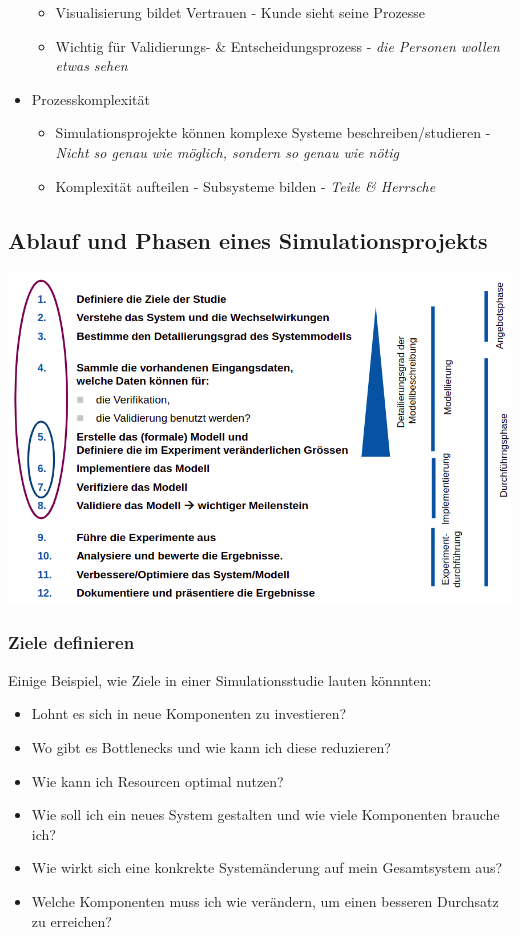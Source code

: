 \begin{itemize}
\begin{itemize}
        \item Visualisierung bildet Vertrauen - Kunde sieht seine Prozesse
        \item Wichtig für Validierungs- \& Entscheidungsprozess - \glqq \textit{ die Personen wollen etwas sehen} \grqq
    \end{itemize}
    \item Prozesskomplexität
    \begin{itemize} 
        \item Simulationsprojekte können komplexe Systeme beschreiben/studieren - \glqq \textit{ Nicht so genau wie möglich, sondern so genau wie nötig}\grqq
        \item Komplexität aufteilen - Subsysteme bilden - \glqq \textit{Teile \& Herrsche}\grqq
    \end{itemize}
\end{itemize}

\subsection{Ablauf und Phasen eines Simulationsprojekts}
\begin{minipage}[t]{1\textwidth}
    \centering
	\includegraphics[width=0.9\linewidth]{images/ablauf-simulationsprojekt.png}
\end{minipage}

\subsubsection{Ziele definieren}
Einige Beispiel, wie Ziele in einer Simulationsstudie lauten könnnten:
\begin{itemize}
    \item Lohnt es sich in neue Komponenten zu investieren?
    \item Wo gibt es Bottlenecks und wie kann ich diese reduzieren?
    \item Wie kann ich Resourcen optimal nutzen?
    \item Wie soll ich ein neues System gestalten und wie viele Komponenten brauche ich?
    \item Wie wirkt sich eine konkrekte Systemänderung auf mein Gesamtsystem aus?
    \item Welche Komponenten muss ich wie verändern, um einen besseren Durchsatz zu erreichen?
\end{itemize}

